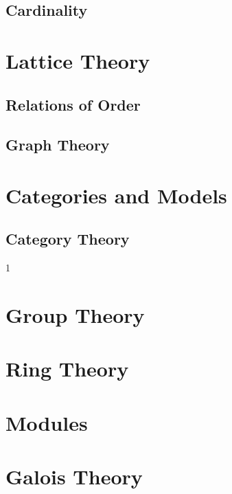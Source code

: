 \documentclass{book}                                                           %
\newcommand*{\TOPPATH}{books}
\newcommand*{\PATH}{\TOPPATH/}
\newcounter{endpage}
\def\compilealgebra{0}
\begin{document}
            \chapter{Cardinality}
                \label{chapt:Cardinality}%
        \part{Lattice Theory}
            \chapter{Relations of Order}
                \label{chapt:Relations_of_Order}%
            \chapter{Graph Theory}
                \label{chapt:Graph_Theory}%
        \part{Categories and Models}
            \chapter{Category Theory}
                \label{chapt:Category_Theory}%
    \fi
    \clearpage

    \setcounter{endpage}{\thepage}
    \label{book:Algebra}%
    \renewcommand{\PATH}{\TOPPATH/Algebra}
    \setcounter{page}{\value{endpage}}

    \if\compilealgebra1
        \part{Group Theory}
            
        \part{Ring Theory}
            
        \part{Modules}
        
        \part{Galois Theory}
            
\end{document}

